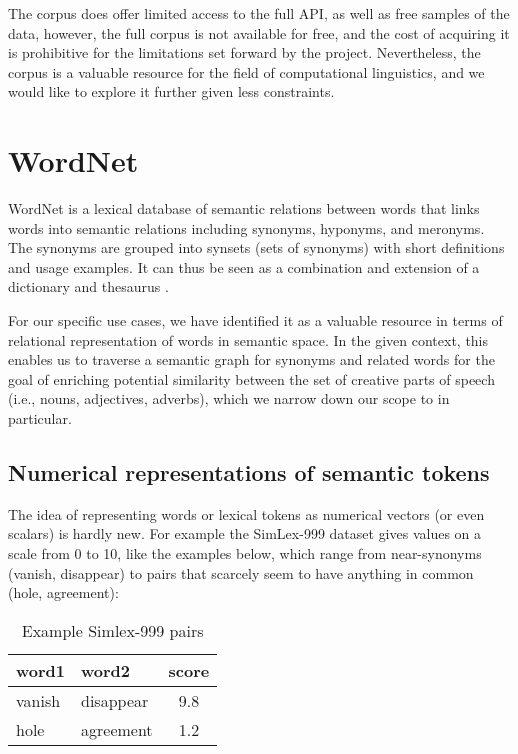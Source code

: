 The corpus does offer limited access to the full API, as well as free samples of the data, however, the full corpus is not available for free, and the cost of acquiring it is prohibitive for the limitations set forward by the project. Nevertheless, the corpus is a valuable resource for the field of computational linguistics, and we would like to explore it further given less constraints.
\section{WordNet}
WordNet\citep{wordnet1998fellbaum} is a lexical database of semantic relations between words that links words into semantic relations including synonyms, hyponyms, and meronyms. The synonyms are grouped into synsets (sets of synonyms) with short definitions and usage examples. It can thus be seen as a combination and extension of a dictionary and thesaurus \citep{enwiki:1143619785}. 

For our specific use cases, we have identified it as a valuable resource in terms of relational representation of words in semantic space. In the given context, this enables us to traverse a semantic graph for synonyms and related words for the goal of enriching potential similarity between the set of creative parts of speech (i.e., nouns, adjectives, adverbs), which we narrow down our scope to in particular. 
\subsection{Numerical representations of semantic tokens}
The idea of representing words or lexical tokens as numerical vectors (or even scalars) is hardly new. 
For example the SimLex-999 dataset \citep*{hill-etal-2015-simlex} gives values on a scale from 0 to 10, like the examples below, which range from near-synonyms (vanish, disappear) to pairs that scarcely seem to have anything in common (hole, agreement):

\begin{table}[htbp]
    \centering
        \begin{tabular}{llc}
            \toprule
            word1 & word2 & score \\
            \midrule
            vanish & disappear & 9.8 \\
            hole & agreement & 1.2 \\
            \bottomrule
       \end{tabular}
    \caption{Example Simlex-999 pairs}
    \label{simlex2pairs}
\end{table}


